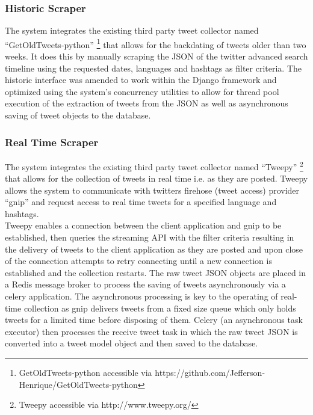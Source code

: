 \documentclass[11pt]{report}
\begin{document}
\subsubsection*{Historic Scraper}
The system integrates the existing third party tweet collector named ``GetOldTweets-python'' \footnote{GetOldTweets-python accessible via https://github.com/Jefferson-Henrique/GetOldTweets-python} that allows for the backdating of tweets older than two weeks. It does this by manually scraping the JSON of the twitter advanced search timeline using the requested dates, languages and hashtags as filter criteria. The historic interface was amended to work within the Django framework and optimized using the system's concurrency utilities to allow for thread pool execution of the extraction of tweets from the JSON as well as asynchronous saving of tweet objects to the database.

\subsubsection*{Real Time Scraper}
The system integrates the existing third party tweet collector named ``Tweepy'' \footnote{Tweepy accessible via http://www.tweepy.org/} that allows for the collection of tweets in real time i.e. as they are posted. Tweepy allows the system to communicate with twitters firehose (tweet access) provider ``gnip'' and request access to real time tweets for a specified language and hashtags.
\\

Tweepy enables a connection between the client application and gnip to be established, then queries the streaming API with the filter criteria resulting in the delivery of tweets to the client application as they are posted and upon close of the connection attempts to retry connecting until a new connection is established and the collection restarts. The raw tweet JSON objects are placed in a Redis message broker to process the saving of tweets asynchronously via a celery application. The asynchronous processing is key to the operating of real-time collection as gnip delivers tweets from a fixed size queue which only holds tweets for a limited time before disposing of them. Celery (an asynchronous task executor) then processes the receive tweet task in which the raw tweet JSON is converted into a tweet model object and then saved to the database.
\end{document}
